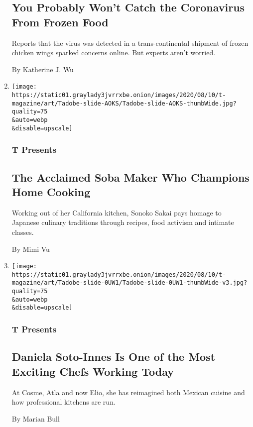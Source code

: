 \begin{enumerate}
{  \subsection{You Probably Won't Catch the Coronavirus From Frozen
  Food}\label{you-probably-wont-catch-the-coronavirus-from-frozen-food}}

  Reports that the virus was detected in a trans-continental shipment of
  frozen chicken wings sparked concerns online. But experts aren't
  worried.

  By Katherine J. Wu
\item
  \href{/2020/08/10/t-magazine/sonoko-sakai-chef-cooking-soba.html}{}

  \texttt{[image: https://static01.graylady3jvrrxbe.onion/images/2020/08/10/t-magazine/art/Tadobe-slide-AOKS/Tadobe-slide-AOKS-thumbWide.jpg?quality=75\\\&auto=webp\\\&disable=upscale]}

  \hypertarget{t-presents}{%
  \subsubsection{T Presents}\label{t-presents}}

  \hypertarget{the-acclaimed-soba-maker-who-champions-home-cooking}{%
  \subsection{The Acclaimed Soba Maker Who Champions Home
  Cooking}\label{the-acclaimed-soba-maker-who-champions-home-cooking}}

  Working out of her California kitchen, Sonoko Sakai pays homage to
  Japanese culinary traditions through recipes, food activism and
  intimate classes.

  By Mimi Vu
\item
  \href{/2020/08/10/t-magazine/daniela-soto-innes-cooking-chef.html}{}

  \texttt{[image: https://static01.graylady3jvrrxbe.onion/images/2020/08/10/t-magazine/art/Tadobe-slide-0UW1/Tadobe-slide-0UW1-thumbWide-v3.jpg?quality=75\\\&auto=webp\\\&disable=upscale]}

  \hypertarget{t-presents-1}{%
  \subsubsection{T Presents}\label{t-presents-1}}

  \hypertarget{daniela-soto-innes-is-one-of-the-most-exciting-chefs-working-today}{%
  \subsection{Daniela Soto-Innes Is One of the Most Exciting Chefs
  Working
  Today}\label{daniela-soto-innes-is-one-of-the-most-exciting-chefs-working-today}}

  At Cosme, Atla and now Elio, she has reimagined both Mexican cuisine
  and how professional kitchens are run.

  By Marian Bull
\end{enumerate}

